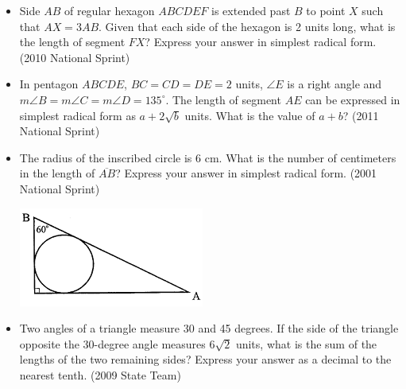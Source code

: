 \documentclass{article}
\begin{document}
\begin{itemize}
\item Side $AB$ of regular hexagon $ABCDEF$ is extended past $B$ to point $X$ such that $AX=3AB$. Given that each side of the hexagon is 2 units long, what is the length of segment $FX$? Express your answer in simplest radical form. (2010 National Sprint)

\item In pentagon $ABCDE$, $BC=CD=DE=2$ units, $\angle E$ is a right angle and $m\angle B=m\angle C=m\angle D=135^\circ$. The length of segment $AE$ can be expressed in simplest radical form as $a+2\sqrt{b}$ units. What is the value of $a+b$? (2011 National Sprint)

\item The radius of the inscribed circle is $6$ cm. What is the number of centimeters in the length of $\overline{AB}$? Express your answer in simplest radical form. (2001 National Sprint)

\centerline{\includegraphics{200122.png}}

\item Two angles of a triangle measure 30 and 45 degrees. If the side of the triangle opposite the 30-degree angle measures $6\sqrt{2}$ units, what is the sum of the lengths of the two remaining sides? Express your answer as a decimal to the nearest tenth. (2009 State Team)


\end{itemize}
\end{document}
